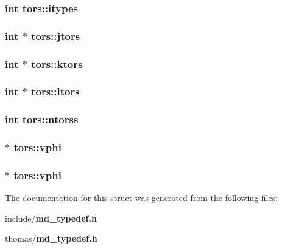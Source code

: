 \subsubsection{\setlength{\rightskip}{0pt plus 5cm}int {\bf tors::itypes}}\label{structtors_a16215448d8f1e277707fd9734ee16aa}


\subsubsection{\setlength{\rightskip}{0pt plus 5cm}int $\ast$ {\bf tors::jtors}}\label{structtors_29d226d78ea55dea151395e63fd53a9b}


\subsubsection{\setlength{\rightskip}{0pt plus 5cm}int $\ast$ {\bf tors::ktors}}\label{structtors_a3445656125838a22f35cb4c196eae90}


\subsubsection{\setlength{\rightskip}{0pt plus 5cm}int $\ast$ {\bf tors::ltors}}\label{structtors_d1c5ed4b10648e045829aaa8a51734d4}


\subsubsection{\setlength{\rightskip}{0pt plus 5cm}int {\bf tors::ntorss}}\label{structtors_e89afe6c6a88a1ac064a7332089d7a23}


\subsubsection{$\ast$ {\bf tors::vphi}}\label{structtors_39b96f7077d34060d7931ad81c3abd6a}


\subsubsection{$\ast$ {\bf tors::vphi}}\label{structtors_39b96f7077d34060d7931ad81c3abd6a}




The documentation for this struct was generated from the following files:\begin{CompactItemize}
\item 
include/{\bf md\_\-typedef.h}\item 
thomas/{\bf md\_\-typedef.h}\end{CompactItemize}
